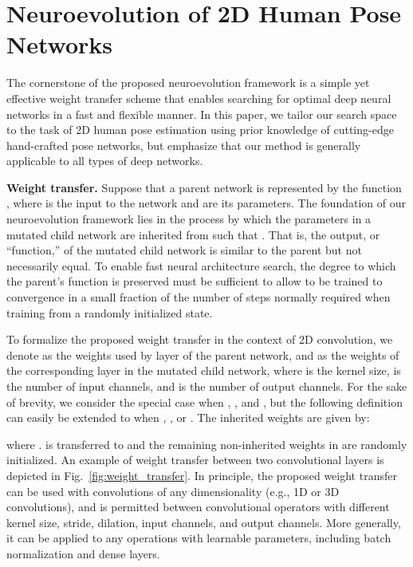 \documentclass[final]{cvpr}
\begin{document}
\section{Neuroevolution of 2D Human Pose Networks}
\label{sec:method}
The cornerstone of the proposed neuroevolution framework is a simple yet effective weight transfer scheme that enables searching for optimal deep neural networks in a fast and flexible manner. In this paper, we tailor our search space to the task of 2D human pose estimation using prior knowledge of cutting-edge hand-crafted pose networks, but emphasize that our method is generally applicable to all types of deep networks.

\medskip\noindent\textbf{Weight transfer.} Suppose that a parent network is represented by the function , where  is the input to the network and  are its parameters. The foundation of our neuroevolution framework lies in the process by which the parameters  in a mutated child network  are inherited from  such that . That is, the output, or ``function,'' of the mutated child network is similar to the parent but not necessarily equal. To enable fast neural architecture search, the degree to which the parent's function is preserved must be sufficient to allow  to be trained to convergence in a small fraction of the number of steps normally required when training from a randomly initialized state. 

To formalize the proposed weight transfer in the context of 2D convolution, we denote  as the weights used by layer  of the parent network, and  as the weights of the corresponding layer in the mutated child network, where  is the kernel size,  is the number of input channels, and  is the number of output channels. For the sake of brevity, we consider the special case when , , and , but the following definition can easily be extended to when , , or . The inherited weights  are given by:

where .  is transferred to  and the remaining non-inherited weights in  are randomly initialized. An example of weight transfer between two convolutional layers is depicted in Fig.\ \ref{fig:weight_transfer}. In principle, the proposed weight transfer can be used with convolutions of any dimensionality (e.g., 1D or 3D convolutions), and is permitted between convolutional operators with different kernel size, stride, dilation, input channels, and output channels.  More generally, it can be applied to any operations with learnable parameters, including batch normalization and dense layers.
\end{document}
